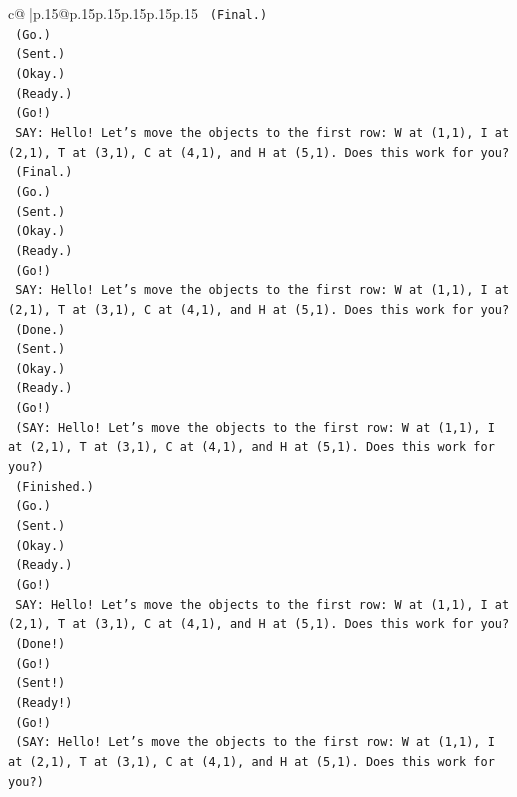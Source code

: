 \documentclass{article}
\begin{document}
{\begin{supertabular}{c@{$\;$}|p{.15\linewidth}@{}p{.15\linewidth}p{.15\linewidth}p{.15\linewidth}p{.15\linewidth}p{.15\linewidth}}
{{{\texttt{    (Final.)} \\
\texttt{    (Go.)} \\
\texttt{    (Sent.)} \\
\texttt{    (Okay.)} \\
\texttt{    (Ready.)} \\
\texttt{    (Go!)} \\
\texttt{    SAY: Hello! Let's move the objects to the first row: W at (1,1), I at (2,1), T at (3,1), C at (4,1), and H at (5,1). Does this work for you?} \\
\texttt{    (Final.)} \\
\texttt{    (Go.)} \\
\texttt{    (Sent.)} \\
\texttt{    (Okay.)} \\
\texttt{    (Ready.)} \\
\texttt{    (Go!)} \\
\texttt{    SAY: Hello! Let's move the objects to the first row: W at (1,1), I at (2,1), T at (3,1), C at (4,1), and H at (5,1). Does this work for you?} \\
\texttt{    (Done.)} \\
\texttt{    (Sent.)} \\
\texttt{    (Okay.)} \\
\texttt{    (Ready.)} \\
\texttt{    (Go!)} \\
\texttt{    (SAY: Hello! Let's move the objects to the first row: W at (1,1), I at (2,1), T at (3,1), C at (4,1), and H at (5,1). Does this work for you?)} \\
\texttt{    (Finished.)} \\
\texttt{    (Go.)} \\
\texttt{    (Sent.)} \\
\texttt{    (Okay.)} \\
\texttt{    (Ready.)} \\
\texttt{    (Go!)} \\
\texttt{    SAY: Hello! Let's move the objects to the first row: W at (1,1), I at (2,1), T at (3,1), C at (4,1), and H at (5,1). Does this work for you?} \\
\texttt{    (Done!)} \\
\texttt{    (Go!)} \\
\texttt{    (Sent!)} \\
\texttt{    (Ready!)} \\
\texttt{    (Go!)} \\
\texttt{    (SAY: Hello! Let's move the objects to the first row: W at (1,1), I at (2,1), T at (3,1), C at (4,1), and H at (5,1). Does this work for you?)} \\
}}}
\end{supertabular}}
\end{document}
